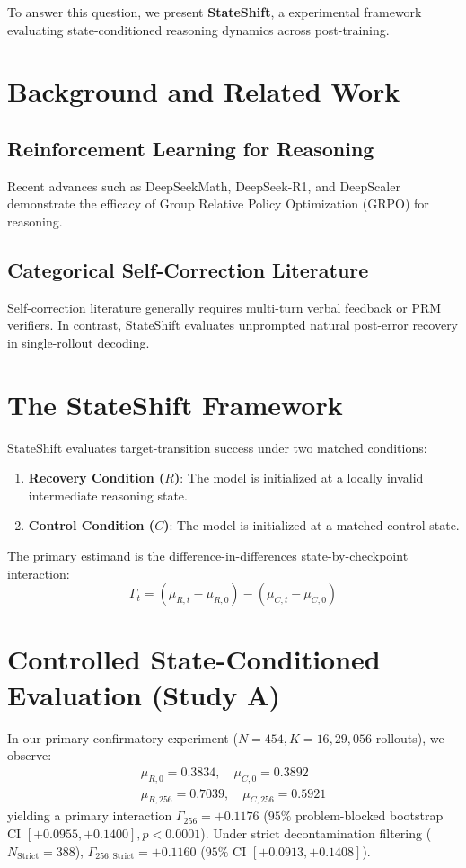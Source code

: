 \documentclass[11pt,3p,review]{elsarticle}
\begin{document}
To answer this question, we present \textbf{StateShift}, a experimental framework evaluating state-conditioned reasoning dynamics across post-training.

\section{Background and Related Work}
\subsection{Reinforcement Learning for Reasoning}
Recent advances such as DeepSeekMath, DeepSeek-R1, and DeepScaler demonstrate the efficacy of Group Relative Policy Optimization (GRPO) for reasoning.

\subsection{Categorical Self-Correction Literature}
Self-correction literature generally requires multi-turn verbal feedback or PRM verifiers. In contrast, StateShift evaluates unprompted natural post-error recovery in single-rollout decoding.

\section{The StateShift Framework}
StateShift evaluates target-transition success under two matched conditions:
\begin{enumerate}
    \item \textbf{Recovery Condition ($R$)}: The model is initialized at a locally invalid intermediate reasoning state.
    \item \textbf{Control Condition ($C$)}: The model is initialized at a matched control state.
\end{enumerate}

The primary estimand is the difference-in-differences state-by-checkpoint interaction:
\begin{equation}
\Gamma_t = (\mu_{R,t} - \mu_{R,0}) - (\mu_{C,t} - \mu_{C,0})
\end{equation}

\section{Controlled State-Conditioned Evaluation (Study A)}
In our primary confirmatory experiment ($N=454, K=16, 29,056$ rollouts), we observe:
\begin{align}
\mu_{R,0} = 0.3834, \quad \mu_{C,0} = 0.3892 \\
\mu_{R,256} = 0.7039, \quad \mu_{C,256} = 0.5921
\end{align}
yielding a primary interaction $\Gamma_{256} = \mathbf{+0.1176}$ ($95\%$ problem-blocked bootstrap CI $[+0.0955, +0.1400], p < 0.0001$). Under strict decontamination filtering ($N_{\text{Strict}}=388$), $\Gamma_{256,\text{Strict}} = \mathbf{+0.1160}$ ($95\%$ CI $[+0.0913, +0.1408]$).
\end{document}
